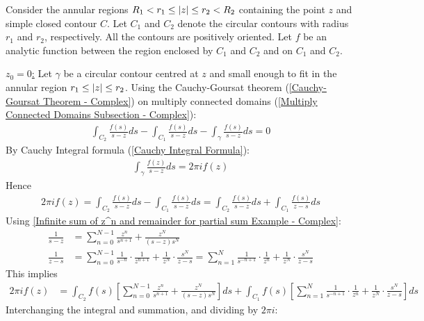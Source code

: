 \documentclass[12pt, english]{book}
\makeatletter
\renewenvironment{proof}[1][\proofname]{\par
	\pushQED{\qed}%
	\normalfont \topsep6\p@\@plus6\p@\relax
	\list{}{%
		\settowidth{\leftmargin}{\itshape\proofname:\hskip\labelsep}%
		\setlength{\labelwidth}{0pt}%
		\setlength{\itemindent}{-\leftmargin}%
		}%
	\item[\hskip\labelsep\itshape#1\@addpunct{:}]\ignorespaces
	}{\popQED\endlist\@endpefalse}
\makeatother
\begin{document}
	\begin{proof}
		Consider the annular regions \(R_1 < r_1 \leq \abs{z} \leq r_2 < R_2\) containing the point \(z\) and simple closed contour \(C\). Let \(C_1\) and \(C_2\) denote the circular contours with radius \(r_1\) and \(r_2\), respectively. All the contours are positively oriented. Let \(f\) be an analytic function between the region enclosed by \(C_1\) and \(C_2\) and on \(C_1\) and \(C_2\).
		
		\underline{\(z_0 = 0\):} \newline
		Let \(\gamma\) be a circular contour centred at \(z\) and small enough to fit in the annular region \(r_1 \leq \abs{z} \leq r_2\). Using the Cauchy-Goursat theorem (\cref{Cauchy-Goursat Theorem - Complex}) on multiply connected domains (\cref{Multiply Connected Domains Subsection - Complex}):
		\begin{align*}
			\int_{C_2} \frac{f(s)}{s-z} ds - \int_{C_1} \frac{f(s)}{s-z} ds - \int_{\gamma} \frac{f(s)}{s-z} ds = 0
		\end{align*}
		By Cauchy Integral formula (\cref{Cauchy Integral Formula}):
		\begin{align*}
			\int_{\gamma} \frac{f(z)}{s-z} ds = 2 \pi i f(z)
 		\end{align*}
 		Hence
 		\begin{align*}
 			2 \pi i f(z) =  \int_{C_2} \frac{f(s)}{s-z} ds - \int_{C_1} \frac{f(s)}{s-z} ds
 				=  \int_{C_2} \frac{f(s)}{s-z} ds + \int_{C_1} \frac{f(s)}{z-s} ds
 		\end{align*}
 		Using \cref{Infinite sum of z^n and remainder for partial sum Example - Complex}:
 		\begin{align*}
 			\frac{1}{s-z} &= \sum_{n=0}^{N-1} \frac{z^n}{s^{n+1}} + \frac{z^N}{(s-z)s^N} \\
 			\frac{1}{z-s} &= \sum_{n=0}^{N-1} \frac{1}{s^{-n}} \cdot \frac{1}{z^{n+1}} + \frac{1}{z^N} \cdot \frac{s^N}{z-s} 
 				= \sum_{n=1}^{N} \frac{1}{s^{-n+1}} \cdot \frac{1}{z^n} + \frac{1}{z^N} \cdot \frac{s^N}{z-s} 
 		\end{align*}
 		This implies
 		\begin{align*}
 			2 \pi i  f(z) 
 			&= \int_{C_2} f(s) 
 			 \left[ \sum_{n=0}^{N-1} \frac{z^n}{s^{n+1}} + \frac{z^N}{(s-z)s^N} \right] ds 
 			 + \int_{C_1} f(s) 
 			 \left[ \sum_{n=1}^{N} \frac{1}{s^{-n+1}} \cdot \frac{1}{z^n} + \frac{1}{z^N} \cdot \frac{s^N}{z-s} \right] ds
 		\end{align*}
 		Interchanging the integral and summation, and dividing by \(2\pi i\):
 		\begin{align*}

\end{align*}
\end{proof}
\end{document}
